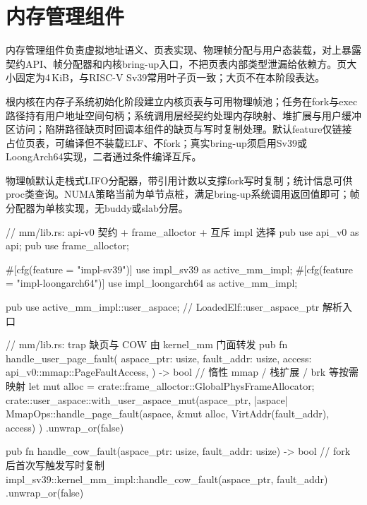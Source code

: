 
\section{内存管理组件}

内存管理组件负责虚拟地址语义、页表实现、物理帧分配与用户态装载，对上暴露契约API、帧分配器和内核bring-up入口，不把页表内部类型泄漏给依赖方。页大小固定为4\,KiB，与RISC-V Sv39常用叶子页一致；大页不在本阶段表达。

根内核在内存子系统初始化阶段建立内核页表与可用物理帧池；任务在fork与exec路径持有用户地址空间句柄；系统调用层经契约处理内存映射、堆扩展与用户缓冲区访问；陷阱路径缺页时回调本组件的缺页与写时复制处理。默认feature仅链接占位页表，可编译但不装载ELF、不fork；真实bring-up须启用Sv39或LoongArch64实现，二者通过条件编译互斥。

物理帧默认走栈式LIFO分配器，带引用计数以支撑fork写时复制；统计信息可供proc类查询。NUMA策略当前为单节点桩，满足bring-up系统调用返回值即可；帧分配器为单核实现，无buddy或slab分层。

\begin{rustcode}
// mm/lib.rs: api-v0 契约 + frame_alloctor + 互斥 impl 选择
pub use api_v0 as api;
pub use frame_alloctor;

#[cfg(feature = "impl-sv39")]
use impl_sv39 as active_mm_impl;
#[cfg(feature = "impl-loongarch64")]
use impl_loongarch64 as active_mm_impl;

pub use active_mm_impl::user_aspace; // LoadedElf::user_aspace_ptr 解析入口
\end{rustcode}

\begin{rustcode}
// mm/lib.rs: trap 缺页与 COW 由 kernel_mm 门面转发
pub fn handle_user_page_fault(
    aspace_ptr: usize,
    fault_addr: usize,
    access: api_v0::mmap::PageFaultAccess,
) -> bool {
    // 惰性 mmap / 栈扩展 / brk 等按需映射
    let mut alloc = crate::frame_alloctor::GlobalPhysFrameAllocator;
    crate::user_aspace::with_user_aspace_mut(aspace_ptr, |aspace| {
        MmapOps::handle_page_fault(aspace, &mut alloc, VirtAddr(fault_addr), access)
    })
    .unwrap_or(false)
}

pub fn handle_cow_fault(aspace_ptr: usize, fault_addr: usize) -> bool {
    // fork 后首次写触发写时复制
    impl_sv39::kernel_mm_impl::handle_cow_fault(aspace_ptr, fault_addr)
        .unwrap_or(false)
}
\end{rustcode}
